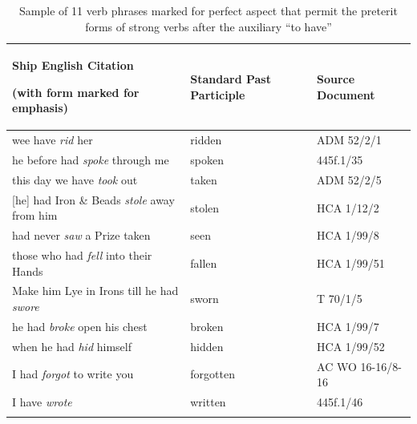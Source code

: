 \begin{table}
\caption{\label{tab:key:6.2} Sample of 11 verb phrases marked for perfect aspect that permit the preterit forms of strong verbs after the auxiliary “to have”}

\begin{tabularx}{\textwidth}{QQQ}
\lsptoprule

\textbf{Ship} \textbf{English} \textbf{Citation} 

(with  form marked for emphasis) & \textbf{Standard} \textbf{Past} \textbf{Participle} & \textbf{Source} \textbf{Document}\\
\midrule 
wee have \textit{rid} her & ridden & ADM 52/2/1\\
he before had \textit{spoke} through me & spoken & 445f.1/35\\
this day we have \textit{took} out & taken & ADM 52/2/5\\{}
[he] had Iron \& Beads \textit{stole} away from him & stolen & HCA 1/12/2\\
had never \textit{saw} a Prize taken & seen & HCA 1/99/8\\
those who had \textit{fell} into their Hands & fallen & HCA 1/99/51\\
Make him Lye in Irons till he had \textit{swore} & sworn & T 70/1/5\\
he had \textit{broke} open his chest & broken & HCA 1/99/7\\
when he had \textit{hid} himself & hidden & HCA 1/99/52\\
I had \textit{forgot} to write you & forgotten & AC WO 16-16/8-16\\
I have \textit{wrote} & written & 445f.1/46\\
\lspbottomrule
\end{tabularx}\end{table}

